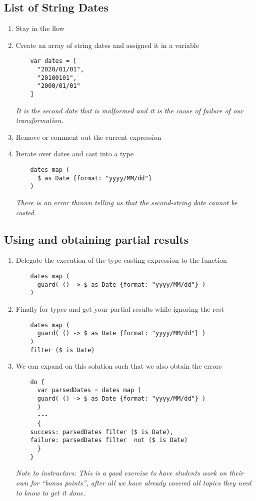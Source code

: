 \subsection{List of String Dates}
\begin{enumerate}
\item Stay in the  flow
\item Create an array of string dates and assigned it in a variable
  \begin{lstlisting}
    var dates = [
      "2020/01/01",
      "20100101",
      "2000/01/01"
    ]
  \end{lstlisting}
  \emph{
    It is the second date that is malformed and it is the cause of failure of our transformation.
  }
\item Remove or comment out the current expression
\item Iterate over dates and cast into a  type
  \begin{lstlisting}
    dates map (
      $ as Date {format: "yyyy/MM/dd"}
    )
  \end{lstlisting}
  \emph{
    There is an error thrown telling us that the second-string date cannot be casted.
  }
\end{enumerate}

\subsection{Using  and obtaining partial results}
\begin{enumerate}[resume*]
\item Delegate the execution of the type-casting expression to the  function
  \begin{lstlisting}
    dates map (
      guard( () -> $ as Date {format: "yyyy/MM/dd"} )
    ) 
  \end{lstlisting}
\item Finally  for  types and get your partial results while ignoring the rest
  \begin{lstlisting}
    dates map (
      guard( () -> $ as Date {format: "yyyy/MM/dd"} )
    )
    filter ($ is Date)
  \end{lstlisting}
\item We can expand on this solution such that we also obtain the errors
  \begin{lstlisting}
    do {
      var parsedDates = dates map (
      guard( () -> $ as Date {format: "yyyy/MM/dd"} )
      )
      ---
      {
	success: parsedDates filter ($ is Date),
	failure: parsedDates filter  not ($ is Date)
      }
    }
  \end{lstlisting}
  \emph{
    Note to instructors: This is a good exercise to have students work on their own for ``bonus points'', after all we have already covered all topics they need to know to get it done.
  }
\end{enumerate}
